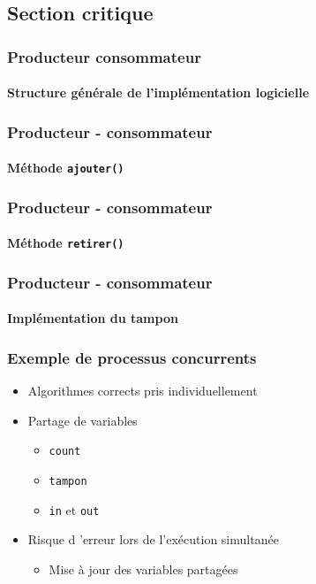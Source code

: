 \subsection{Section critique}

\begin{frame}
\frametitle{Producteur consommateur }
\framesubtitle{Structure générale de l'implémentation logicielle}
\begin{scriptsize}\end{scriptsize}
\end{frame}

\begin{frame}
\frametitle{Producteur - consommateur}
\framesubtitle{Méthode \texttt{ajouter()}}
\begin{scriptsize}\end{scriptsize}
\end{frame}

\begin{frame}
\frametitle{Producteur - consommateur}
\framesubtitle{Méthode \texttt{retirer()}}
\begin{scriptsize}\end{scriptsize}
\end{frame}

\begin{frame}
\frametitle{Producteur - consommateur}
\framesubtitle{Implémentation du tampon}
\begin{scriptsize}\end{scriptsize}
\end{frame}

\begin{frame}
\frametitle{Exemple de processus concurrents}
\begin{itemize}
\item Algorithmes corrects pris individuellement
\item Partage de variables
\begin{itemize}
\item \texttt{count}
\item \texttt{tampon}
\item \texttt{in} et \texttt{out}
\end{itemize}
\item Risque d ’erreur lors de l’exécution simultanée
\begin{itemize}
\item Mise à jour des variables partagées
\end{itemize}
\end{itemize}
\end{frame}

